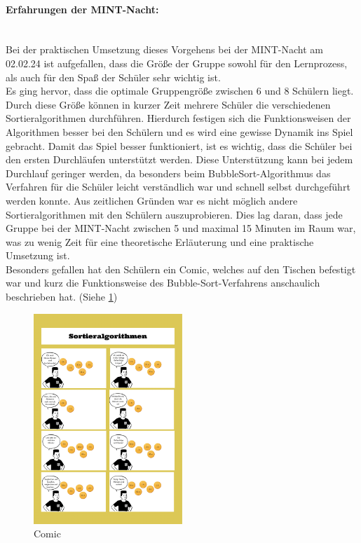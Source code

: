 \documentclass[./entry.tex]{subfiles}
\begin{document}
	\paragraph{Erfahrungen der MINT-Nacht:} \mbox{} \\
	Bei der praktischen Umsetzung dieses Vorgehens bei der MINT-Nacht am 02.02.24 ist aufgefallen, dass die Größe der Gruppe sowohl für den Lernprozess, als auch für den Spaß der Schüler sehr wichtig ist.
	\\
	Es ging hervor, dass die optimale Gruppengröße zwischen 6 und 8 Schülern liegt.
	Durch diese Größe können in kurzer Zeit mehrere Schüler die verschiedenen Sortieralgorithmen durchführen.
	Hierdurch festigen sich die Funktionsweisen der Algorithmen besser bei den Schülern und es wird eine gewisse Dynamik ins Spiel gebracht.
	Damit das Spiel besser funktioniert, ist es wichtig, dass die Schüler bei den ersten Durchläufen unterstützt werden.
	Diese Unterstützung kann bei jedem Durchlauf geringer werden, da besonders beim BubbleSort-Algorithmus das Verfahren für die Schüler leicht verständlich war und schnell selbst durchgeführt werden konnte.
	Aus zeitlichen Gründen war es nicht möglich andere Sortieralgorithmen mit den Schülern auszuprobieren.
	Dies lag daran, dass jede Gruppe bei der MINT-Nacht zwischen 5 und maximal 15 Minuten im Raum war, was zu wenig Zeit für eine theoretische Erläuterung und eine praktische Umsetzung ist. \\
	Besonders gefallen hat den Schülern ein Comic, welches auf den Tischen befestigt war und kurz die Funktionsweise des \dq Bubble-Sort\dq-Verfahrens anschaulich beschrieben hat. (Siehe \ref{fig:comic})
	\begin{figure}[h]
			\includegraphics[width=0.5\textwidth]{assets/comic.PNG}
			\caption{Comic}
			\label{fig:comic}
	\end{figure}
\end{document}
